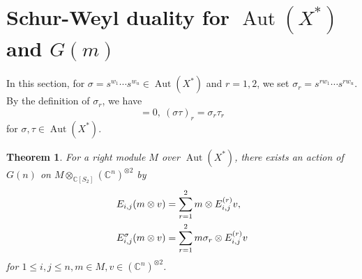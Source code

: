 \documentclass{article}
\newtheorem{Theorem}[equation]{Theorem}
\theoremstyle{definition}
\theoremstyle{remark}
\numberwithin{equation}{section}
\DeclareMathOperator{\Aut}{Aut}
\numberwithin{equation}{section}
\begin{document}
\section{Schur-Weyl duality for $\Aut(X^*)$ and $G(m)$}
In this section, for $\sigma=s^{w_1}\cdots s^{w_u}\in\Aut(X^*)$ and $r=1,2$, we set $\sigma_r=s^{rw_1}\cdots s^{rw_u}$. By the definition of $\sigma_r$, we have
\begin{equation}
[\sigma_1,\tau_2]=0,\ 
(\sigma\tau)_r=\sigma_r\tau_r\label{deff1}
\end{equation}
for $\sigma,\tau\in\Aut(X^*)$.
\begin{Theorem}\label{SW-2-1}
For a right module $M$ over $\Aut(X^*)$, there exists an action of $G(n)$ on $M\otimes_{\mathbb{C}[S_2]}(\mathbb{C}^n)^{\otimes 2}$ by
\begin{align*}
E_{i,j}(m\otimes v)&=\sum_{r=1}^2\limits m\otimes E^{(r)}_{i,j}v,\\
E^\sigma_{i,j}(m\otimes v)&=\sum_{r=1}^2\limits m\sigma_r\otimes E^{(r)}_{i,j}v
\end{align*}
for $1\leq i,j\leq n,m\in M,v\in(\mathbb{C}^n)^{\otimes2}$.
\end{Theorem}
\end{document}
